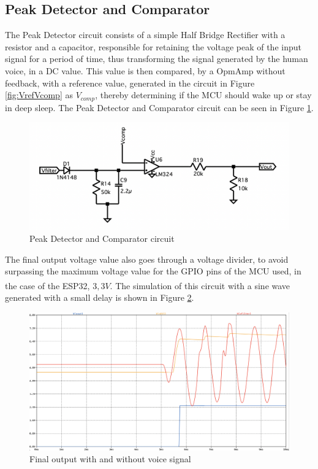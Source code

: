 \subsection{Peak Detector and Comparator}

The Peak Detector circuit consists of a simple Half Bridge Rectifier with a resistor and a capacitor, responsible for retaining the voltage peak of the input signal for a period of time, thus transforming the signal generated by the human voice, in a DC value. This value is then compared, by a OpmAmp without feedback, with a reference value, generated in the circuit in Figure \ref{fig:VrefVcomp} as $V_{comp}$, thereby determining if the MCU should wake up or stay in deep sleep. The Peak Detector and Comparator circuit can be seen in Figure \ref{fig:PeakandComp}.

\begin{figure}[H]
    \centering
    \includegraphics*[scale = 0.4]{Images/PeakandComp.png}
    \caption{Peak Detector and Comparator circuit}
    \label{fig:PeakandComp}
\end{figure}

The final output voltage value also goes through a voltage divider, to avoid surpassing the maximum voltage value for the GPIO pins of the MCU used, in the case of the ESP32, $3,3V$\textsuperscript{\cite{ESP32-datasheet}}. The simulation of this circuit with a sine wave generated with a small delay is shown in Figure \ref{fig:SimPeakandComp}.

\begin{figure}[H]
    \centering
    \includegraphics*[scale = 0.25]{Images/SimPeakandComp.png}
    \caption{Final output with and without voice signal}
    \label{fig:SimPeakandComp}
\end{figure}
